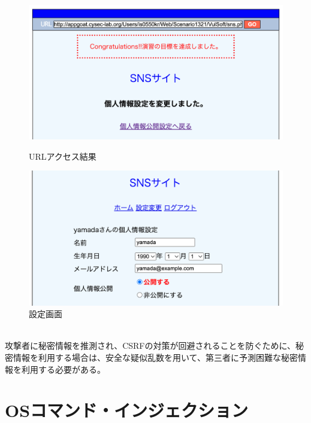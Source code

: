 \documentclass[dvipdfmx,autodetect-engine,titlepage]{jsarticle}
\begin{document}
\begin{figure}[H]
  \centering
  \begin{minipage}[b]{0.45\linewidth}
  \begin{center}
    \includegraphics[keepaspectratio,scale=0.3]{cs4.png}
    \end{center}
    \caption{URLアクセス結果}
  \end{minipage}
  \begin{minipage}[b]{0.45\linewidth}
  \begin{center}
    \includegraphics[keepaspectratio,scale=0.3]{cs5.png}
    \end{center}
    \caption{設定画面}
  \end{minipage}
\end{figure}
　\\
攻撃者に秘密情報を推測され、CSRFの対策が回避されることを防ぐために、秘密情報を利用する場合は、安全な疑似乱数を用いて、第三者に予測困難な秘密情報を利用する必要がある。\\

\section{OSコマンド・インジェクション}
\end{document}
